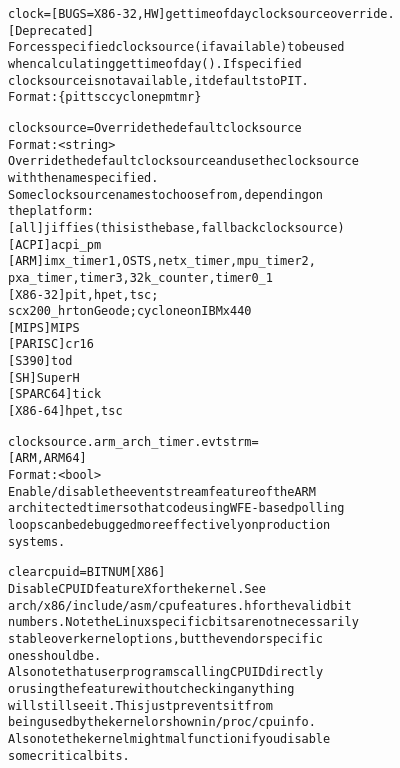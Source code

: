 \documentclass[a4paper,8pt,english]{sphinxmanual}
\begin{document}
\begin{alltt}
        clock=          {[}BUGS=X86-32, HW{]} gettimeofday clocksource override.
                        {[}Deprecated{]}
                        Forces specified clocksource (if available) to be used
                        when calculating gettimeofday(). If specified
                        clocksource is not available, it defaults to PIT.
                        Format: \{ pit \textbar{} tsc \textbar{} cyclone \textbar{} pmtmr \}

        clocksource=    Override the default clocksource
                        Format: \textless{}string\textgreater{}
                        Override the default clocksource and use the clocksource
                        with the name specified.
                        Some clocksource names to choose from, depending on
                        the platform:
                        {[}all{]} jiffies (this is the base, fallback clocksource)
                        {[}ACPI{]} acpi\_pm
                        {[}ARM{]} imx\_timer1,OSTS,netx\_timer,mpu\_timer2,
                                pxa\_timer,timer3,32k\_counter,timer0\_1
                        {[}X86-32{]} pit,hpet,tsc;
                                scx200\_hrt on Geode; cyclone on IBM x440
                        {[}MIPS{]} MIPS
                        {[}PARISC{]} cr16
                        {[}S390{]} tod
                        {[}SH{]} SuperH
                        {[}SPARC64{]} tick
                        {[}X86-64{]} hpet,tsc

        clocksource.arm\_arch\_timer.evtstrm=
                        {[}ARM,ARM64{]}
                        Format: \textless{}bool\textgreater{}
                        Enable/disable the eventstream feature of the ARM
                        architected timer so that code using WFE-based polling
                        loops can be debugged more effectively on production
                        systems.

        clearcpuid=BITNUM {[}X86{]}
                        Disable CPUID feature X for the kernel. See
                        arch/x86/include/asm/cpufeatures.h for the valid bit
                        numbers. Note the Linux specific bits are not necessarily
                        stable over kernel options, but the vendor specific
                        ones should be.
                        Also note that user programs calling CPUID directly
                        or using the feature without checking anything
                        will still see it. This just prevents it from
                        being used by the kernel or shown in /proc/cpuinfo.
                        Also note the kernel might malfunction if you disable
                        some critical bits.


\end{alltt}
\end{document}

